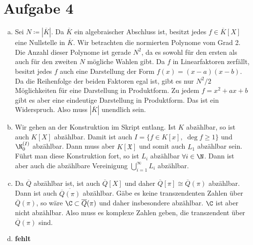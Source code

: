 \documentclass{article}
\begin{document}
    \section*{Aufgabe 4}
    \begin{enumerate}[(a)]
        \item Sei $N \coloneqq |\overline{K}|$.
        Da $\overline{K}$ ein algebraischer Abschluss ist, besitzt jedes $f\in \overline{K}[X]$ eine Nullstelle in $\overline{K}$.
        Wir betrachten die normierten Polynome vom Grad 2. 
        Die Anzahl dieser Polynome ist gerade $N^2$, da es sowohl für den ersten als auch für den zweiten $N$ mögliche Wahlen gibt.
        Da $f$ in Linearfaktoren zerfällt, besitzt jedes $f$ auch eine Darstellung der Form $f(x) = (x - a)(x - b)$. Da die Reihenfolge der beiden Faktoren egal ist, gibt es nur $N^2/2$ Möglichkeiten für eine Darstellung in Produktform. Zu jedem $f = x^2 + ax + b$ gibt es aber eine eindeutige Darstellung in Produktform. Das ist ein Widerspruch. Also muss $|\overline{K}|$ unendlich sein.
        \item Wir gehen an der Konstruktion im Skript entlang. Ist $K$ abzählbar, so ist auch $K[X]$ abzählbar. Damit ist auch $I = \{f \in K[x],\; \deg f \geq 1\}$ und $\N_0^{(I)}$ abzählbar. Dann muss aber $K[\mathfrak{X}]$ und somit auch $L_1$ abzählbar sein. Führt man diese Konstruktion fort, so ist $L_i$ abzählbar $\forall i \in \N$.
        Dann ist aber auch die abzählbare Vereinigung $\bigcup_{i = 1}^\infty L_i$ abzählbar.
        \item Da $\overline{Q}$ abzählbar ist, ist auch $\overline{Q}[X]$ und daher $\overline{Q}[\pi] \cong \overline{Q}(\pi)$ abzählbar. Dann ist auch $\overline{\overline{Q}(\pi)}$ abzählbar. Gäbe es keine transzendenten Zahlen über $\overline{Q}(\pi)$, so wäre $\C \subset \overline{Q}(\pi)$ und daher insbesondere abzählbar. $\C$ ist aber nicht abzählbar. Also muss es komplexe Zahlen geben, die transzendent über $\overline{Q}(\pi)$ sind.
        \item \textbf{fehlt}
    \end{enumerate}
\end{document}
